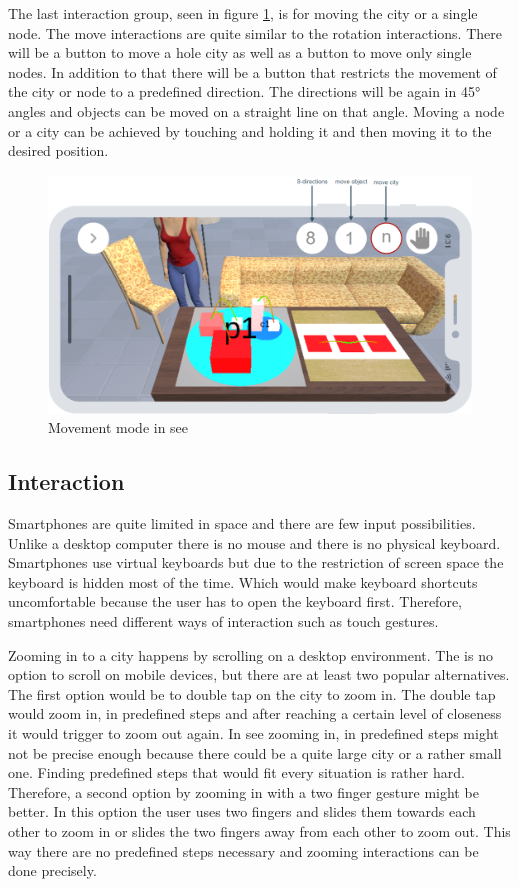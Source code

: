 The last interaction group, seen in figure \ref{fig:move}, is for moving the \gls{city} or a single node.
The move interactions are quite similar to the rotation interactions.
There will be a button to move a hole \gls{city} as well as a button to move only single nodes.
In addition to that there will be a button that restricts the movement of the \gls{city} or node to a predefined direction.
The directions will be again in 45° angles and objects can be moved on a straight line on that angle.
Moving a node or a \gls{city} can be achieved by touching and holding it and then moving it to the desired position.
\begin{figure}[htb]
    \centering
    \includegraphics[width=1\textwidth]{Concept/img/menu5.png}
    \caption{Movement mode in \gls{see}}\label{fig:move}
\end{figure}

\subsection{Interaction}

Smartphones are quite limited in space and there are few input possibilities.
Unlike a desktop computer there is no mouse and there is no physical keyboard.
Smartphones use virtual keyboards but due to the restriction of screen space the keyboard is hidden most of the time.
Which would make keyboard shortcuts uncomfortable because the user has to open the keyboard first.
Therefore, smartphones need different ways of interaction such as touch gestures. 

Zooming in to a \gls{city} happens by scrolling on a desktop environment. 
The is no option to scroll on mobile devices, but there are at least two popular alternatives.
The first option would be to double tap on the \gls{city} to zoom in.
The double tap would zoom in, in predefined steps and after reaching a certain level of closeness it would trigger to zoom out again.
In \gls{see} zooming in, in predefined steps might not be precise enough because there could be a quite large \gls{city} or a rather small one.
Finding predefined steps that would fit every situation is rather hard.
Therefore, a second option by zooming in with a two finger gesture might be better. 
In this option the user uses two fingers and slides them towards each other to zoom in or slides the two fingers away from each other to zoom out.
This way there are no predefined steps necessary and zooming interactions can be done precisely.
